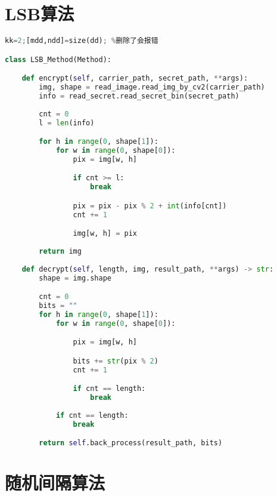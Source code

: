 \documentclass[a4paper,zihao=5,UTF8]{ctexart}
\begin{document}
\section{LSB算法}

\begin{lstlisting}[language=Python]%设置不同语言即可。
kk=2;[mdd,ndd]=size(dd); %删除了会报错

class LSB_Method(Method):

    def encrypt(self, carrier_path, secret_path, **args):
        img, shape = read_image.read_img_by_cv2(carrier_path)
        info = read_secret.read_secret_bin(secret_path)
        
        cnt = 0
        l = len(info)

        for h in range(0, shape[1]):
            for w in range(0, shape[0]):
                pix = img[w, h]

                if cnt >= l:
                    break

                pix = pix - pix % 2 + int(info[cnt])
                cnt += 1

                img[w, h] = pix
        
        return img
    
    def decrypt(self, length, img, result_path, **args) -> str:
        shape = img.shape

        cnt = 0
        bits = ""
        for h in range(0, shape[1]):
            for w in range(0, shape[0]):

                pix = img[w, h]

                bits += str(pix % 2)
                cnt += 1

                if cnt == length:
                    break
            
            if cnt == length:
                break

        return self.back_process(result_path, bits)

\end{lstlisting}

\section{随机间隔算法}
\end{document}
